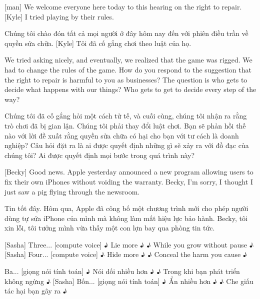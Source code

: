 \documentclass[a4paper]{article}
\begin{document}
	[man] We welcome everyone here today to this hearing on the right to repair.
	[Kyle] I tried playing by their rules.
	
	\begin{vietnamese-v2}
		 Chúng tôi chào đón tất cả mọi người ở đây hôm nay đến với phiên điều trần về quyền sửa chữa.
		[Kyle] Tôi đã cố gắng chơi theo luật của họ.
	\end{vietnamese-v2}
	
	We tried asking nicely, and eventually, we realized that the game was rigged.
	We had to change the rules of the game.
	How do you respond to the suggestion that the right to repair is harmful to you as businesses?
	The question is who gets to decide what happens with our things?
	Who gets to get to decide every step of the way?
	
	\begin{vietnamese-v2}
		Chúng tôi đã cố gắng hỏi một cách tử tế, và cuối cùng, chúng tôi nhận ra rằng trò chơi đã bị gian lận.
		Chúng tôi phải thay đổi luật chơi.
		Bạn sẽ phản hồi thế nào với lời đề xuất rằng quyền sửa chữa có hại cho bạn với tư cách là doanh nghiệp?
		Câu hỏi đặt ra là ai được quyết định những gì sẽ xảy ra với đồ đạc của chúng tôi?
		Ai được quyết định mọi bước trong quá trình này?
	\end{vietnamese-v2}
	
	[Becky] Good news.
	Apple yesterday announced a new program allowing users to fix their own iPhones without voiding the warranty.
	Becky, I'm sorry, I thought I just saw a pig flying through the newsroom.
	
	\begin{vietnamese-v2}
		[Becky] Tin tốt đây.
		Hôm qua, Apple đã công bố một chương trình mới cho phép người dùng tự sửa iPhone của mình mà không làm mất hiệu lực bảo hành.
		Becky, tôi xin lỗi, tôi tưởng mình vừa thấy một con lợn bay qua phòng tin tức.
	\end{vietnamese-v2}
	
	
	[Sasha] Three...
	[compute voice] ♪ Lie more ♪
	♪ While you grow without pause ♪
	[Sasha] Four...
	[compute voice] ♪ Hide more ♪
	♪ Conceal the harm you cause ♪
	
	\begin{vietnamese-v2}
		[Sasha] Ba...
		[giọng nói tính toán] ♪ Nói dối nhiều hơn ♪
		♪ Trong khi bạn phát triển không ngừng ♪
		[Sasha] Bốn...
		[giọng nói tính toán] ♪ Ẩn nhiều hơn ♪
		♪ Che giấu tác hại bạn gây ra ♪
	\end{vietnamese-v2}
	
\end{document}
